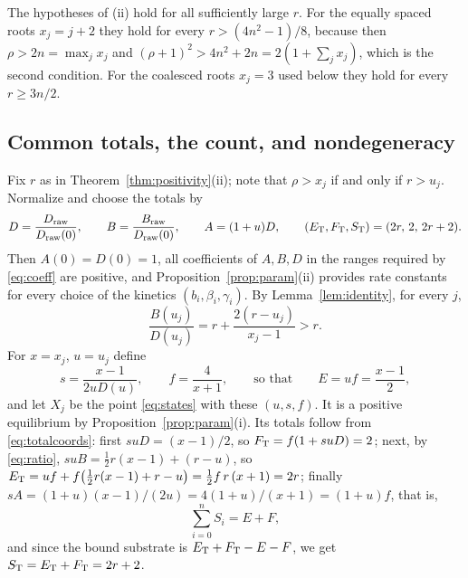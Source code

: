 The hypotheses of (ii) hold for all sufficiently large \(r\). For the equally spaced roots
\(x_j=j+2\) they hold for every \(r>(4n^2-1)/8\), because then \(\rho>2n=\max_jx_j\) and
\((\rho+1)^2>4n^2+2n=2(1+\sum_jx_j)\), which is the second condition. For the coalesced roots
\(x_j=3\) used below they hold for every \(r\ge3n/2\).

\subsection{Common totals, the count, and nondegeneracy}
Fix \(r\) as in Theorem~\ref{thm:positivity}(ii); note that \(\rho>x_j\) if and only if
\(r>u_j\). Normalize and choose the totals by
\begin{equation}\label{eq:normalize}
 D=\frac{D_{\mathrm{raw}}}{D_{\mathrm{raw}}(0)},\qquad B=\frac{B_{\mathrm{raw}}}{D_{\mathrm{raw}}(0)},\qquad
 A=(1+u)D,\qquad (E_{\mathrm T},F_{\mathrm T},S_{\mathrm T})=(2r,\,2,\,2r+2).
\end{equation}
Then \(A(0)=D(0)=1\), all coefficients of \(A,B,D\) in the ranges required by \eqref{eq:coeff}
are positive, and Proposition~\ref{prop:param}(ii) provides rate constants for every choice of
the kinetics \((b_i,\beta_i,\gamma_i)\). By Lemma~\ref{lem:identity}, for every \(j\),
\begin{equation}\label{eq:ratio}
 \frac{B(u_j)}{D(u_j)}=r+\frac{2(r-u_j)}{x_j-1}>r .
\end{equation}
For \(x=x_j\), \(u=u_j\) define
\begin{equation}\label{eq:sf}
 s=\frac{x-1}{2uD(u)},\qquad f=\frac{4}{x+1},\qquad\text{so that}\qquad E=uf=\frac{x-1}{2},
\end{equation}
and let \(X_j\) be the point \eqref{eq:states} with these \((u,s,f)\). It is a positive
equilibrium by Proposition~\ref{prop:param}(i). Its totals follow from \eqref{eq:totalcoords}:
first \(suD=(x-1)/2\), so \(F_{\mathrm T}=f(1+suD)=2\); next, by \eqref{eq:ratio},
\(suB=\tfrac12r(x-1)+(r-u)\), so
\(E_{\mathrm T}=uf+f\bigl(\tfrac12r(x-1)+r-u\bigr)=\tfrac12 f\,r\,(x+1)=2r\); finally
\(sA=(1+u)(x-1)/(2u)=4(1+u)/(x+1)=(1+u)f\), that is,
\begin{equation}\label{eq:freeinventory}
 \sum_{i=0}^nS_i=E+F ,
\end{equation}
and since the bound substrate is \(E_{\mathrm T}+F_{\mathrm T}-E-F\), we get \(S_{\mathrm T}=E_{\mathrm T}+F_{\mathrm T}=2r+2\).

